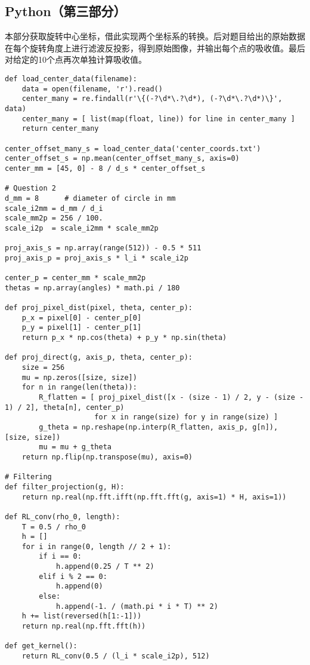 \subsection{Python（第三部分）}
本部分获取旋转中心坐标，借此实现两个坐标系的转换。后对题目给出的原始数据在每个旋转角度上进行滤波反投影，得到原始图像，并输出每个点的吸收值。最后对给定的10个点再次单独计算吸收值。
\begin{verbatim}
def load_center_data(filename):
    data = open(filename, 'r').read()
    center_many = re.findall(r'\{(-?\d*\.?\d*), (-?\d*\.?\d*)\}', data)
    center_many = [ list(map(float, line)) for line in center_many ]
    return center_many

center_offset_many_s = load_center_data('center_coords.txt')
center_offset_s = np.mean(center_offset_many_s, axis=0)
center_mm = [45, 0] - 8 / d_s * center_offset_s

# Question 2
d_mm = 8      # diameter of circle in mm
scale_i2mm = d_mm / d_i
scale_mm2p = 256 / 100.
scale_i2p  = scale_i2mm * scale_mm2p

proj_axis_s = np.array(range(512)) - 0.5 * 511
proj_axis_p = proj_axis_s * l_i * scale_i2p

center_p = center_mm * scale_mm2p
thetas = np.array(angles) * math.pi / 180

def proj_pixel_dist(pixel, theta, center_p):
    p_x = pixel[0] - center_p[0]
    p_y = pixel[1] - center_p[1]
    return p_x * np.cos(theta) + p_y * np.sin(theta)

def proj_direct(g, axis_p, theta, center_p):
    size = 256
    mu = np.zeros([size, size])
    for n in range(len(theta)):
        R_flatten = [ proj_pixel_dist([x - (size - 1) / 2, y - (size - 1) / 2], theta[n], center_p)
                     for x in range(size) for y in range(size) ]
        g_theta = np.reshape(np.interp(R_flatten, axis_p, g[n]), [size, size])
        mu = mu + g_theta
    return np.flip(np.transpose(mu), axis=0)

# Filtering
def filter_projection(g, H):
    return np.real(np.fft.ifft(np.fft.fft(g, axis=1) * H, axis=1))

def RL_conv(rho_0, length):
    T = 0.5 / rho_0
    h = []
    for i in range(0, length // 2 + 1):
        if i == 0:
            h.append(0.25 / T ** 2)
        elif i % 2 == 0:
            h.append(0)
        else:
            h.append(-1. / (math.pi * i * T) ** 2)
    h += list(reversed(h[1:-1]))
    return np.real(np.fft.fft(h))

def get_kernel():
    return RL_conv(0.5 / (l_i * scale_i2p), 512)


\end{verbatim}

